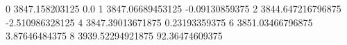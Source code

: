 0 3847.158203125 0.0
1 3847.06689453125 -0.09130859375
2 3844.647216796875 -2.510986328125
4 3847.39013671875 0.23193359375
6 3851.03466796875 3.87646484375
8 3939.52294921875 92.36474609375
